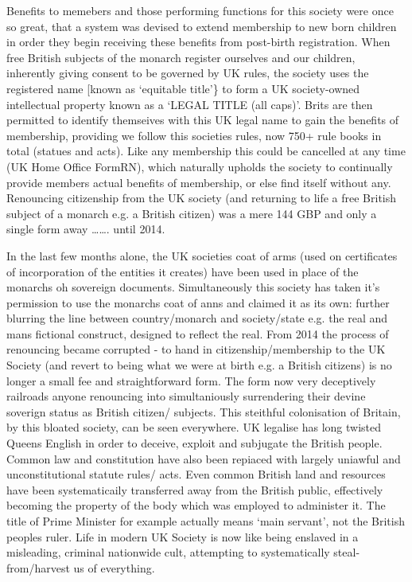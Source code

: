\documentclass[letterpaper,10pt,openany,oneside,english]{sphinxmanual}
\begin{document}
Benefits to memebers and those performing functions for this society were once so great, that a system was devised to extend membership to new born children in order they begin receiving these benefits from post-birth registration. When free British subjects of the monarch register ourselves and our children, inherently giving consent to be governed by UK rules, the society uses the registered name {[}known as ‘equitable title’\} to form a UK society-owned intellectual property known as a ‘LEGAL TITLE (all caps)’. Brits are then permitted to identify themseives with this UK legal name to gain the benefits of membership, providing we follow this societies rules, now 750+ rule books in total (statues and acts). Like any membership this could be cancelled at any time (UK Home Office FormRN), which naturally upholds the society to continually provide members actual benefits of membership, or else find itself without any. Renouncing citizenship from the UK society (and returning to life a free British subject of a monarch e.g. a British citizen) was a mere 144 GBP and only a single form away ……. until 2014.

In the last few months alone, the UK societies coat of arms (used on certificates of incorporation of the entities it creates) have been used in place of the monarchs oh sovereign documents. Simultaneously this society has taken it’s permission to use the monarchs coat of anns and claimed it as its own: further blurring the line between country/monarch and society/state e.g. the real and mans fictional construct, designed to reflect the real. From 2014 the process of renouncing became corrupted - to hand in citizenship/membership to the UK Society (and revert to being what we were at birth e.g. a British citizens) is no longer a small fee and straightforward form. The form now very deceptively railroads anyone renouncing into simultaniously surrendering their devine soverign status as British citizen/ subjects. This steithful colonisation of Britain, by this bloated society, can be seen everywhere. UK legalise has long twisted Queens English in order to deceive, exploit and subjugate the British people. Common law and constitution have also been repiaced with largely uniawful and unconstitutional statute rules/ acts. Even common British land and resources have been systematicaily transferred away from the British public, effectively becoming the property of the body which was employed to administer it. The title of Prime Minister for example actually means ‘main servant’, not the British peoples ruler. Life in modern UK Society is now like being enslaved in a misleading, criminal nationwide cult, attempting to systematically steal-from/harvest us of everything.
\end{document}

